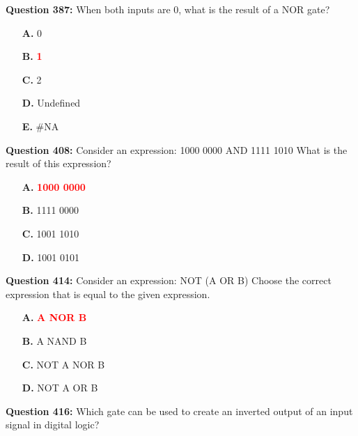 \documentclass[12pt,a4paper]{article}
\begin{document}
\vspace{0.5cm}

\textbf{Question 387:} When both inputs are 0, what is the result of a NOR gate?

\begin{itemize}
    \item[\textbf{A.}] 0
    \item[\textbf{B.}] \textcolor{red}{\textbf{1}}
    \item[\textbf{C.}] 2
    \item[\textbf{D.}] Undefined
    \item[\textbf{E.}] \#NA
\end{itemize}

\vspace{0.5cm}

\vspace{0.5cm}

\textbf{Question 408:} Consider an expression: 1000 0000 AND 1111 1010 What is the result of this expression?

\begin{itemize}
    \item[\textbf{A.}] \textcolor{red}{\textbf{1000 0000}}
    \item[\textbf{B.}] 1111 0000
    \item[\textbf{C.}] 1001 1010
    \item[\textbf{D.}] 1001 0101
\end{itemize}

\vspace{0.5cm}

\vspace{0.5cm}

\textbf{Question 414:} Consider an expression: NOT (A OR B) Choose the correct expression that is equal to the given expression.

\begin{itemize}
    \item[\textbf{A.}] \textcolor{red}{\textbf{A NOR B}}
    \item[\textbf{B.}] A NAND B
    \item[\textbf{C.}] NOT A NOR B
    \item[\textbf{D.}] NOT A OR B
\end{itemize}

\vspace{0.5cm}

\vspace{0.5cm}

\textbf{Question 416:} Which gate can be used to create an inverted output of an input signal in digital logic?
\end{document}

